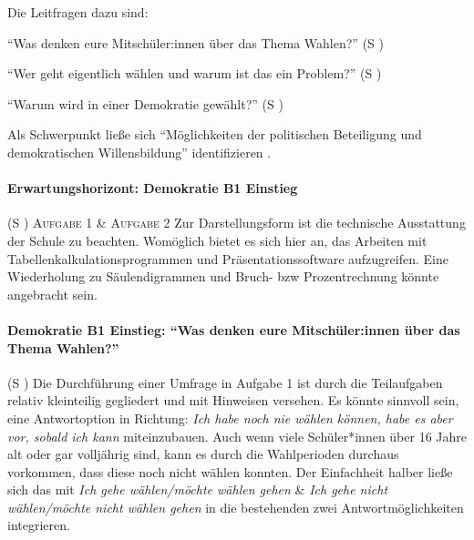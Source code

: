 Die Leitfragen dazu sind: 
\begin{myenumerate}
    \item \enquote{Was denken eure Mitschüler:innen über das Thema Wahlen?} (\gls{S} \pageref{DEMOKRATIE-B1})
    \item \enquote{Wer geht eigentlich wählen und warum ist das ein Problem?} (\gls{S} \pageref{DEMOKRATIE-B2})
    \item \enquote{Warum wird in einer Demokratie gewählt?} (\gls{S} \pageref{DEMOKRATIE-B3})
\end{myenumerate}
Als Schwerpunkt ließe sich
\enquote{Möglichkeiten der politischen Beteiligung und demokratischen Willensbildung} identifizieren \autocite[][16]{bplan}.


\paragraph{Erwartungshorizont: Demokratie B1 Einstieg} (\gls{S} \pageref{DEMOKRATIE-B1})
\textsc{Aufgabe 1} \quad \& 
\textsc{Aufgabe 2} \quad Zur Darstellungsform ist die technische Ausstattung der Schule zu beachten. Womöglich bietet es sich hier an, das Arbeiten mit Tabellenkalkulationsprogrammen und Präsentationssoftware aufzugreifen.  Eine Wiederholung zu Säulendigrammen und Bruch- \gls{bzw} Prozentrechnung könnte angebracht sein. 
\\


\paragraph{Demokratie B1 Einstieg: \enquote{Was denken eure Mitschüler:innen über das Thema Wahlen?}}  (\gls{S} \pageref{DEMOKRATIE-B1})
Die Durchführung einer Umfrage in Aufgabe 1 ist durch die Teilaufgaben relativ kleinteilig gegliedert und mit Hinweisen versehen. Es könnte sinnvoll sein, eine Antwortoption in Richtung: \emph{Ich habe noch nie wählen können, habe es aber vor, sobald ich kann} miteinzubauen. Auch wenn viele Schüler*innen über 16 Jahre alt oder gar volljährig sind, kann es durch die Wahlperioden durchaus vorkommen, dass diese noch nicht wählen konnten. 
Der Einfachheit halber ließe sich das mit \emph{Ich gehe wählen/möchte wählen gehen} \& \emph{Ich gehe nicht wählen/möchte nicht wählen gehen} in die bestehenden zwei Antwortmöglichkeiten integrieren. 

